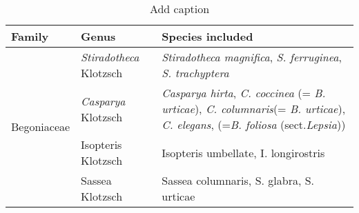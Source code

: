 \begin{table}[htbp]
  \centering
  \caption{Add caption}
    \begin{tabular}{cll}
    \toprule
    \multicolumn{1}{l}{Family} & Genus & Species included \\
    \midrule
    \multirow{4}[8]{*}{Begoniaceae} & \textit{Stiradotheca} Klotzsch & \textit{Stiradotheca magnifica}, \textit{S. ferruginea}, \textit{S. trachyptera} \\
\cmidrule{2-3}          & \textit{Casparya} Klotzsch & \multicolumn{1}{p{37.355em}}{\textit{Casparya hirta}, \textit{C. coccinea} (= \textit{B. urticae}), \textit{C. columnaris}\newline{}(= \textit{B. urticae}), \textit{C. elegans}, (=\textit{B. foliosa} (sect.\newline{}\textit{Lepsia}))} \\
\cmidrule{2-3}          & Isopteris Klotzsch & Isopteris umbellate, I. longirostris \\
\cmidrule{2-3}          & Sassea Klotzsch & Sassea columnaris, S. glabra, S. urticae \\
    \bottomrule
    \bottomrule
    \end{tabular}%
  \label{tab:addlabel}%
\end{table}%
